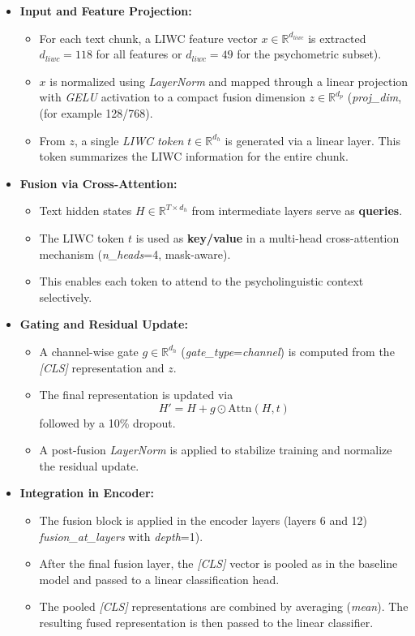 \begin{itemize}
    \item \textbf{Input and Feature Projection:}
    \begin{itemize}
        \item For each text chunk, a LIWC feature vector \(x \in \mathbb{R}^{d_{liwc}}\) is extracted \(d_{liwc}=118\) for all features or \(d_{liwc}=49\) for the psychometric subset).
        \item \(x\) is normalized using \textit{LayerNorm} and mapped through a linear projection with \textit{GELU} activation to a compact fusion dimension \(z \in \mathbb{R}^{d_p}\) (\textit{proj\_dim}, (for example 128/768).
        \item From \(z\), a single \emph{LIWC token} \(t \in \mathbb{R}^{d_h}\) is generated via a linear layer. This token summarizes the LIWC information for the entire chunk.
    \end{itemize}

    
    \item \textbf{Fusion via Cross-Attention:}
    \begin{itemize}
        \item Text hidden states \(H \in \mathbb{R}^{T \times d_h}\) from intermediate layers serve as \textbf{queries}.
        \item The LIWC token \(t\) is used as \textbf{key/value} in a multi-head cross-attention mechanism (\textit{n\_heads}=4, mask-aware).
        \item This enables each token to attend to the psycholinguistic context selectively.
    \end{itemize}
    
    \item \textbf{Gating and Residual Update:}
    \begin{itemize}
        \item A channel-wise gate \(g \in \mathbb{R}^{d_h}\) (\textit{gate\_type}=\textit{channel}) is computed from the \textit{[CLS]} representation and \(z\).
        \item The final representation is updated via \[H' = H + g \odot \mathrm{Attn}(H, t)\] followed by a 10\% dropout.
        \item A post-fusion \textit{LayerNorm} is applied to stabilize training and normalize the residual update.

    \end{itemize}
    
    \item \textbf{Integration in Encoder:}
    \begin{itemize}
        \item The fusion block is applied in the encoder layers (layers 6 and 12) \textit{fusion\_at\_layers} with \textit{depth}=1).
        \item After the final fusion layer, the \textit{[CLS]} vector is pooled as in the baseline model and passed to a linear classification head.
        \item The pooled \textit{[CLS]} representations are combined by averaging (\textit{mean}). The resulting fused representation is then passed to the linear classifier.


\end{itemize}
\end{itemize}
